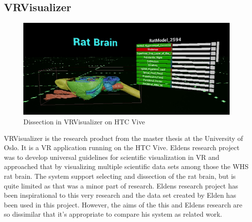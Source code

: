 \subsection*{VRVisualizer}\label{chap:vrvis}
\begin{figure}[H]
    \centering
    \includegraphics[width=\textwidth]{fig/vrvis_ratbrain.jpg}
    \caption{Dissection in VRVisualizer on HTC Vive}
    \label{fig:vrvis}
\end{figure}
VRVisualizer is the research product from the master thesis \citet{Elden2017} at the University of Oslo. It is a VR application running on the HTC Vive. Eldens research project was to develop universal guidelines for scientific visualization in VR and approached that by visualizing multiple scientific data sets among those the WHS rat brain. The system support selecting and dissection of the rat brain, but is quite limited as that was a minor part of research. Eldens research project has been inspirational to this very research and the data set created by Elden has been used in this project. However, the aims of the this and Eldens research are so dissimilar that it's appropriate to compare his system as related work. 





